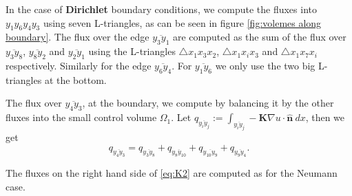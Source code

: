 \documentclass[../Main/main.tex]{subfiles}
\begin{document}
	\par
	In the case of \textbf{Dirichlet} boundary conditions, we compute the fluxes into $y_1 y_6 y_4 y_3$ using seven L-triangles, as can be seen in figure \ref{fig:volemes along boundary}. The flux over the edge $\overline{y_3 y_1}$ are computed as the sum of the flux over $\overline{y_3 y_8}$, $\overline{y_8 y_2}$ and $\overline{y_2 y_1}$ using the L-triangles $\triangle x_1 x_3 x_2$, $\triangle x_1 x_i x_3$ and $\triangle x_1 x_7 x_i$ respectively. Similarly for the edge $\overline{y_6 y_4}$. For $\overline{y_1 y_6}$ we only use the two big L-triangles at the bottom. 
	\par 
	The flux over $\overline{y_4 y_3}$, at the boundary, we compute by balancing it by the other fluxes into the small control volume $\Omega_1$. Let $	q_{\overline{y_i y_j}}:= \int_{\overline{y_i y_j}}  -\pmb{K}\nabla u \cdot \pmb{\hat{n}}\ dx $, then we get
	\begin{equation}\label{eq:K2}
		q_{\overline{y_4 y_3}} = q_{\overline{y_3 y_8}} + q_{\overline{y_8 y_{10}}}+q_{\overline{y_{10}y_9}}+q_{\overline{y_9 y_4}}.
	\end{equation}
	
	The fluxes on the right hand side of \eqref{eq:K2} are computed as for the Neumann case.
\end{document}
